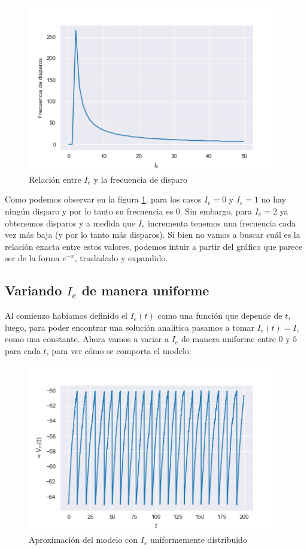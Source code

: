 \documentclass [a4paper,12pt,oneside,final]{article}
\begin{document}
\begin{figure}[ht]
  \centering
  \includegraphics[width=11cm,keepaspectratio]{./diagramas/grafico_c.png}
  \caption{Relación entre $I_e$ y la frecuencia de disparo}\label{fig:c}
\end{figure}

Como podemos observar en la figura \ref{fig:c}, para los casos $I_e = 0$ y $I_e = 1$ no hay ningún disparo y por lo tanto su frecuencia es 0. Sin embargo, para $I_e = 2$ ya obtenemos disparos y a medida que $I_e$ incrementa tenemos una frecuencia cada vez más baja (y por lo tanto más disparos). Si bien no vamos a buscar cuál es la relación exacta entre estos valores, podemos intuir a partir del gráfico que parece ser de la forma $e^{-x}$, trasladado y expandido.

\subsection{Variando $I_e$ de manera uniforme}

Al comienzo habíamos definido el $I_e(t)$ como una función que depende de $t$, luego, para poder encontrar una solución analítica pasamos a tomar $I_e(t) = I_e$ como una constante. Ahora vamos a variar a $I_e$ de manera uniforme entre $0$ y $5$ para cada $t$, para ver cómo se comporta el modelo:

\begin{figure}[ht]
  \centering
  \includegraphics[width=11cm,keepaspectratio]{./diagramas/grafico_d.png}
  \caption{Aproximación del modelo con $I_e$ uniformemente distribuido}\label{fig:d}
\end{figure}
\end{document}
